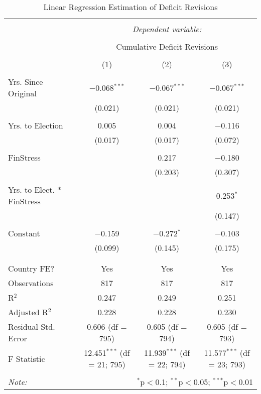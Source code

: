 
\begin{table}[!htbp] \centering 
  \caption{Linear Regression Estimation of Deficit Revisions} 
  \label{deficit_results} 
\footnotesize 
\begin{tabular}{@{\extracolsep{5pt}}lccc} 
\\[-1.8ex]\hline 
\hline \\[-1.8ex] 
 & \multicolumn{3}{c}{\textit{Dependent variable:}} \\ 
\cline{2-4} 
\\[-1.8ex] & \multicolumn{3}{c}{Cumulative Deficit Revisions} \\ 
\\[-1.8ex] & (1) & (2) & (3)\\ 
\hline \\[-1.8ex] 
 Yrs. Since Original & $-$0.068$^{***}$ & $-$0.067$^{***}$ & $-$0.067$^{***}$ \\ 
  & (0.021) & (0.021) & (0.021) \\ 
  & & & \\ 
 Yrs. to Election & 0.005 & 0.004 & $-$0.116 \\ 
  & (0.017) & (0.017) & (0.072) \\ 
  & & & \\ 
 FinStress &  & 0.217 & $-$0.180 \\ 
  &  & (0.203) & (0.307) \\ 
  & & & \\ 
 Yrs. to Elect. * FinStress &  &  & 0.253$^{*}$ \\ 
  &  &  & (0.147) \\ 
  & & & \\ 
 Constant & $-$0.159 & $-$0.272$^{*}$ & $-$0.103 \\ 
  & (0.099) & (0.145) & (0.175) \\ 
  & & & \\ 
\hline \\[-1.8ex] 
Country FE? & Yes & Yes & Yes \\ 
Observations & 817 & 817 & 817 \\ 
R$^{2}$ & 0.247 & 0.249 & 0.251 \\ 
Adjusted R$^{2}$ & 0.228 & 0.228 & 0.230 \\ 
Residual Std. Error & 0.606 (df = 795) & 0.605 (df = 794) & 0.605 (df = 793) \\ 
F Statistic & 12.451$^{***}$ (df = 21; 795) & 11.939$^{***}$ (df = 22; 794) & 11.577$^{***}$ (df = 23; 793) \\ 
\hline 
\hline \\[-1.8ex] 
\textit{Note:}  & \multicolumn{3}{r}{$^{*}$p$<$0.1; $^{**}$p$<$0.05; $^{***}$p$<$0.01} \\ 
\end{tabular} 
\end{table} 
